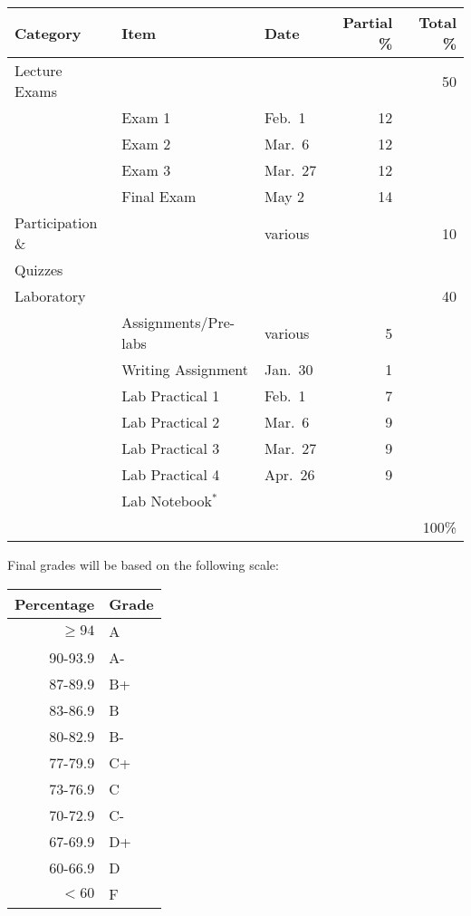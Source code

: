 \documentclass{tufte-handout}
\begin{document}
\begin{tabular}{l l l rr}
Category & Item & Date & Partial \% & Total \% \\
\hline
Lecture Exams & & &  & 50\\
& Exam 1 & Feb.\ 1 & 12 \\							%
& Exam 2 & Mar.\ 6 & 12 \\							%
& Exam 3 & Mar.\ 27 & 12 \\						%
& Final Exam & May 2 & 14 \\ 							%
\hline 
Participation \& &  & various  & & 10 \\
Quizzes & & & \\
\hline
Laboratory & & & & 40\\
& Assignments/Pre-labs & various & 5 \\
& Writing Assignment & Jan.\ 30 & 1 &  \\
& Lab Practical 1 & Feb.\ 1 & 7 & \\
& Lab Practical 2 & Mar.\ 6 & 9 & \\
& Lab Practical 3 & Mar.\ 27 & 9 & \\
& Lab Practical 4 & Apr.\ 26 &9 & \\
& Lab Notebook$^*$ \\
\hline
& & & &  100\%
\end{tabular}


\begin{margintable}
Final grades will be based on the following scale:\\
\begin{tabular}{rl}
Percentage & Grade \\
\hline 
$\ge94$ & A \\
90-93.9 & A- \\
87-89.9 & B+ \\
83-86.9 & B \\
80-82.9 & B- \\
77-79.9 & C+ \\
73-76.9 & C \\
70-72.9 & C- \\
67-69.9 & D+ \\
60-66.9 & D \\
$<60$ & F \\
\hline
\end{tabular}
\end{margintable}
\end{document}
